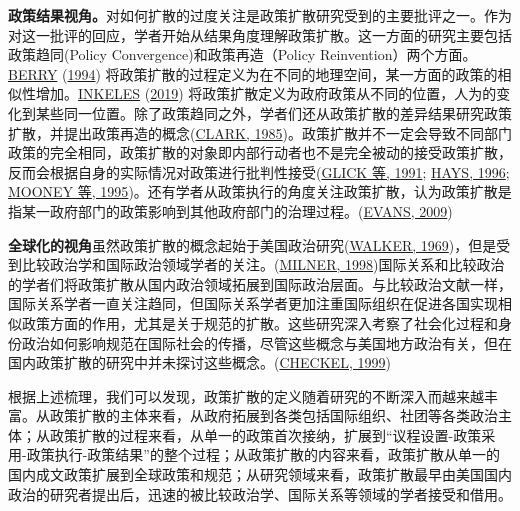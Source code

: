 \documentclass[
  12pt,
]{ctexart}
\begin{document}
\textbf{政策结果视角。}对如何扩散的过度关注是政策扩散研究受到的主要批评之一。作为对这一批评的回应，学者开始从结果角度理解政策扩散。这一方面的研究主要包括政策趋同(Policy Convergence)和政策再造（Policy Reinvention）两个方面。\protect\hyperlink{ref-Berry1994}{BERRY} (\protect\hyperlink{ref-Berry1994}{1994}) 将政策扩散的过程定义为在不同的地理空间，某一方面的政策的相似性增加。\protect\hyperlink{ref-Inkeles2019}{INKELES} (\protect\hyperlink{ref-Inkeles2019}{2019}) 将政策扩散定义为政府政策从不同的位置，人为的变化到某些同一位置。除了政策趋同之外，学者们还从政策扩散的差异结果研究政策扩散，并提出政策再造的概念(\protect\hyperlink{ref-Clark1985}{CLARK, 1985})。政策扩散并不一定会导致不同部门政策的完全相同，政策扩散的对象即内部行动者也不是完全被动的接受政策扩散，反而会根据自身的实际情况对政策进行批判性接受(\protect\hyperlink{ref-GlickHays1991}{GLICK 等, 1991}; \protect\hyperlink{ref-Hays1996}{HAYS, 1996}; \protect\hyperlink{ref-MooneyLee1995}{MOONEY 等, 1995})。还有学者从政策执行的角度关注政策扩散，认为政策扩散是指某一政府部门的政策影响到其他政府部门的治理过程。(\protect\hyperlink{ref-Evans2009}{EVANS, 2009})

\textbf{全球化的视角}虽然政策扩散的概念起始于美国政治研究(\protect\hyperlink{ref-Walker1969}{WALKER, 1969})，但是受到比较政治学和国际政治领域学者的关注。(\protect\hyperlink{ref-Milner1998}{MILNER, 1998})国际关系和比较政治的学者们将政策扩散从国内政治领域拓展到国际政治层面。与比较政治文献一样，国际关系学者一直关注趋同，但国际关系学者更加注重国际组织在促进各国实现相似政策方面的作用，尤其是关于规范的扩散。这些研究深入考察了社会化过程和身份政治如何影响规范在国际社会的传播，尽管这些概念与美国地方政治有关，但在国内政策扩散的研究中并未探讨这些概念。(\protect\hyperlink{ref-Checkel1999}{CHECKEL, 1999})

根据上述梳理，我们可以发现，政策扩散的定义随着研究的不断深入而越来越丰富。从政策扩散的主体来看，从政府拓展到各类包括国际组织、社团等各类政治主体；从政策扩散的过程来看，从单一的政策首次接纳，扩展到``议程设置-政策采用-政策执行-政策结果''的整个过程；从政策扩散的内容来看，政策扩散从单一的国内成文政策扩展到全球政策和规范；从研究领域来看，政策扩散最早由美国国内政治的研究者提出后，迅速的被比较政治学、国际关系等领域的学者接受和借用。
\end{document}
